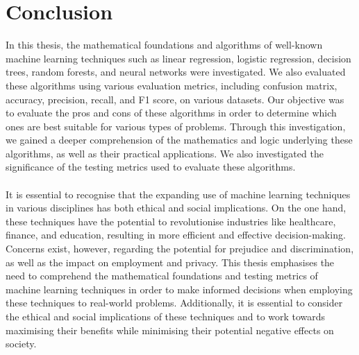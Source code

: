 \documentclass{article}[12pt]
\theoremstyle{definition}
\begin{document}
\newpage

\bigskip

\section{Conclusion}

\bigskip

In this thesis, the mathematical foundations and algorithms of well-known machine learning techniques such as linear regression, logistic regression, decision trees, random forests, and neural networks were investigated. We also evaluated these algorithms using various evaluation metrics, including confusion matrix, accuracy, precision, recall, and F1 score, on various datasets. Our objective was to evaluate the pros and cons of these algorithms in order to determine which ones are best suitable for various types of problems. Through this investigation, we gained a deeper comprehension of the mathematics and logic underlying these algorithms, as well as their practical applications. We also investigated the significance of the testing metrics used to evaluate these algorithms.
\\
\\
It is essential to recognise that the expanding use of machine learning techniques in various disciplines has both ethical and social implications. On the one hand, these techniques have the potential to revolutionise industries like healthcare, finance, and education, resulting in more efficient and effective decision-making. Concerns exist, however, regarding the potential for prejudice and discrimination, as well as the impact on employment and privacy. This thesis emphasises the need to comprehend the mathematical foundations and testing metrics of machine learning techniques in order to make informed decisions when employing these techniques to real-world problems. Additionally, it is essential to consider the ethical and social implications of these techniques and to work towards maximising their benefits while minimising their potential negative effects on society.








\newpage

\end{document}
